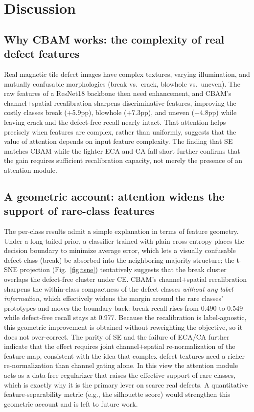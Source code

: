 \documentclass[a4paper,fleqn]{cas-sc}
\begin{document}
\begin{sloppypar}
	\section{Discussion}
	\label{sec:discussion}

	\subsection{Why CBAM works: the complexity of real defect features}
	\par{
		Real magnetic tile defect images have complex textures, varying illumination, and mutually confusable morphologies (break vs.\ crack, blowhole vs.\ uneven). The raw features of a ResNet18 backbone then need enhancement, and CBAM's channel$+$spatial recalibration sharpens discriminative features, improving the costly classes break ($+$5.9pp), blowhole ($+$7.3pp), and uneven ($+$4.8pp) while leaving crack and the defect-free recall nearly intact. That attention helps precisely when features are complex, rather than uniformly, suggests that the value of attention depends on input feature complexity. The finding that SE matches CBAM while the lighter ECA and CA fall short further confirms that the gain requires sufficient recalibration capacity, not merely the presence of an attention module.
	}

	\subsection{A geometric account: attention widens the support of rare-class features}
	\par{
		The per-class results admit a simple explanation in terms of feature geometry. Under a long-tailed prior, a classifier trained with plain cross-entropy places the decision boundary to minimize average error, which lets a visually confusable defect class (break) be absorbed into the neighboring majority structure; the t-SNE projection (Fig.~\ref{fig:tsne}) tentatively suggests that the break cluster overlaps the defect-free cluster under CE. CBAM's channel$+$spatial recalibration sharpens the within-class compactness of the defect classes \emph{without any label information}, which effectively widens the margin around the rare classes' prototypes and moves the boundary back: break recall rises from 0.490 to 0.549 while defect-free recall stays at 0.977. Because the recalibration is label-agnostic, this geometric improvement is obtained without reweighting the objective, so it does not over-correct. The parity of SE and the failure of ECA/CA further indicate that the effect requires joint channel$+$spatial re-normalization of the feature map, consistent with the idea that complex defect textures need a richer re-normalization than channel gating alone. In this view the attention module acts as a data-free regularizer that raises the effective support of rare classes, which is exactly why it is the primary lever on scarce real defects. A quantitative feature-separability metric (e.g., the silhouette score) would strengthen this geometric account and is left to future work.
	}


\end{sloppypar}
\end{document}
